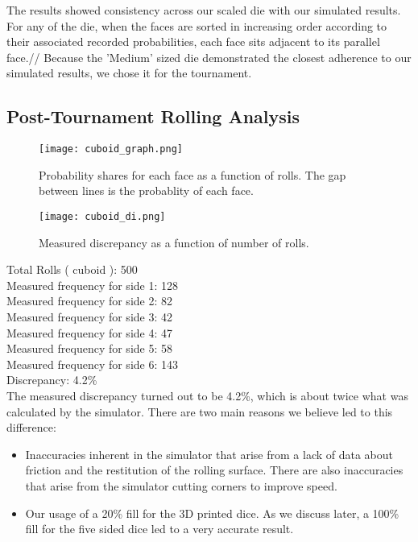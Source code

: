 The results showed consistency across our scaled die with our simulated results. For any of the die, when the faces are sorted in increasing order according to their associated recorded probabilities, each face sits adjacent to its parallel face.//
Because the 'Medium' sized die demonstrated the closest adherence to our simulated results, we chose it for the tournament.

\subsection{Post-Tournament Rolling Analysis}
\begin{figure}[h]
\center
\texttt{[image: cuboid\_graph.png]}
\caption{Probability shares for each face as a function of rolls. The gap between lines is the probablity of each face.}
\label{fig:cuboid}
\end{figure}
\begin{figure}[h]
\center
\texttt{[image: cuboid\_di.png]}
\caption{Measured discrepancy as a function of number of rolls.}
\label{fig:cuboid}
\end{figure}
Total Rolls ( cuboid ): 500\\
Measured frequency for side 1: 128\\
Measured frequency for side 2: 82\\
Measured frequency for side 3: 42\\
Measured frequency for side 4: 47\\
Measured frequency for side 5: 58\\
Measured frequency for side 6: 143\\
Discrepancy: 4.2\%\\
The measured discrepancy turned out to be 4.2\%, which is about twice what was calculated by the simulator. There are two main reasons we believe led to this difference:\\
\begin{itemize}
    \item Inaccuracies inherent in the simulator that arise from a lack of data about friction and the restitution of the rolling surface. There are also inaccuracies that arise from the simulator cutting corners to improve speed.\\
    \item Our usage of a 20\% fill for the 3D printed dice. As we discuss later, a 100\% fill for the five sided dice led to a very accurate result.
\end{itemize}
